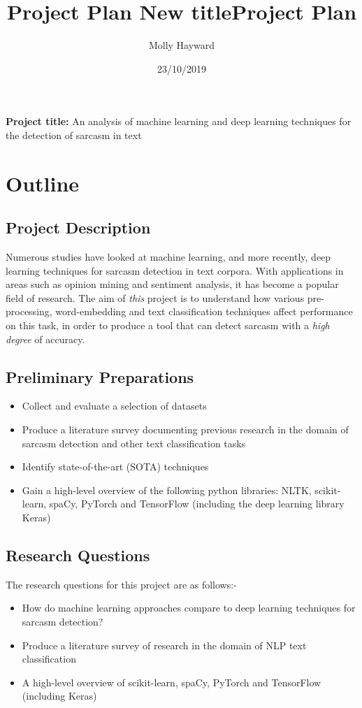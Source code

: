 \documentclass[12pt,a4paper]{article}
\title{Project Plan \large \newline 
New title}
\title{Project Plan}
\author{Molly Hayward}
\date{23/10/2019}
\begin{document}
\maketitle

\noindent \textbf{Project title:} An analysis of machine learning and deep learning techniques for the detection of sarcasm in text

\section{Outline}
\subsection{Project Description}
\noindent Numerous studies have looked at machine learning, and more recently, deep learning  techniques for sarcasm detection in text corpora. With applications in areas such as opinion mining and sentiment analysis, it has become a popular field of research. The aim of \textit{this} project is to understand how various pre-processing, word-embedding and text classification techniques affect performance on this task, in order to produce a tool that can detect sarcasm with a \textit{high degree} of accuracy.\\

\subsection{Preliminary Preparations}
\begin{itemize}
	\setlength\itemsep{0em}
	\item Collect and evaluate a selection of datasets
	\item Produce a literature survey documenting previous research in the domain of sarcasm detection and other text classification tasks
	\item Identify state-of-the-art (SOTA) techniques
	\item Gain a high-level overview of the following python libraries: NLTK, scikit-learn, spaCy, PyTorch and TensorFlow (including the deep learning library Keras)
\end{itemize}
\subsection{Research Questions}
The research questions for this project are as follows:-
\begin{itemize}
	\setlength\itemsep{0em}
	\item How do machine learning approaches compare to deep learning techniques for sarcasm detection?
	\item Produce a literature survey of research in the domain of NLP text classification
	\item A high-level overview of scikit-learn, spaCy, PyTorch and TensorFlow (including Keras)
\end{itemize}
\end{document}
